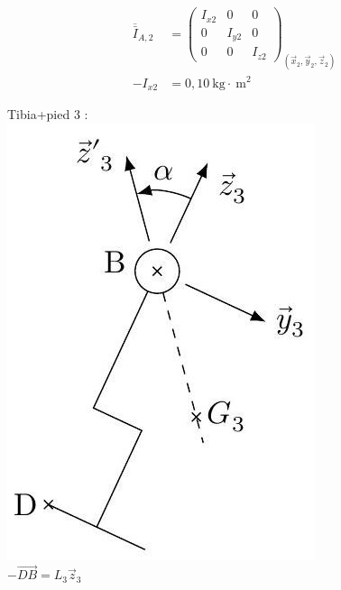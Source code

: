 \documentclass[10pt]{article}
\begin{document}
$$
\begin{aligned}
\overline{\bar{I}}_{A, 2} & =\left(\begin{array}{ccc}
I_{x 2} & 0 & 0 \\
0 & I_{y 2} & 0 \\
0 & 0 & I_{z 2}
\end{array}\right)_{\left(\vec{x}_{2}, \vec{y}_{2}, \vec{z}_{2}\right)} \\
-I_{x 2} & =0,10 \mathrm{~kg} \cdot \mathrm{~m}^{2}
\end{aligned}
$$

Tibia+pied 3 :\\
\includegraphics[max width=\textwidth, center]{2025_07_03_97545f5dc188959e5663g-13}\\
$-\overrightarrow{D B}=L_{3} \vec{z}_{3}$
\end{document}
